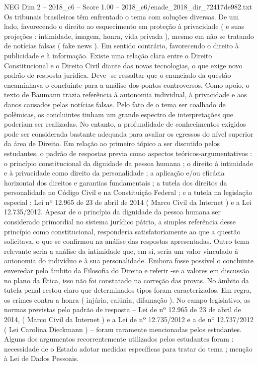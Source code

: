 \begin{textsample}{NEG Dim 2 – 2018\_c6 – Score 1.00 – 2018\_c6/enade\_2018\_dir\_72417de982.txt}
Os tribunais brasileiros têm enfrentado o tema com soluções diversas.
De um lado, favorecendo o direito ao esquecimento em proteção à privacidade ( e suas projeções : intimidade, imagem, honra, vida privada ), mesmo em não se tratando de notícias falsas ( fake news ).
Em sentido contrário, favorecendo o direito à publicidade e à informação.
Existe uma relação clara entre o Direito Constitucional e o Direito Civil diante das novas tecnologias, o que exige novo padrão de resposta jurídica.
Deve -se ressaltar que o enunciado da questão encaminhava o concluinte para a análise dos pontos controversos.
Como apoio, o texto de Baumann trazia referência à autonomia individual, à privacidade e aos danos causados pelas notícias falsas.
Pelo fato de o tema ser coalhado de polêmicas, os concluintes tinham um grande espectro de interpretações que poderiam ser realizadas.
No entanto, a profundidade de conhecimentos exigidos pode ser considerada bastante adequada para avaliar os egressos do nível superior da área de Direito.
Em relação ao primeiro tópico a ser discutido pelos estudantes, o padrão de respostas previa como aspectos teóricos-argumentativos : o princípio constitucional da dignidade da pessoa humana ; o direito à intimidade e à privacidade como direito da personalidade ; a aplicação e/ou eficácia horizontal dos direitos e garantias fundamentais ; a tutela dos direitos da personalidade no Código Civil e na Constituição Federal ; e a tutela na legislação especial : Lei nº 12.965 de 23 de abril de 2014 ( Marco Civil da Internet ) e a Lei 12.735/2012.
Apesar de o princípio da dignidade da pessoa humana ser considerado primordial no sistema jurídico pátrio, a simples referência desse princípio como constitucional, responderia satisfatoriamente ao que a questão solicitava, o que se confirmou na análise das respostas apresentadas.
Outro tema relevante seria a análise da intimidade que, em si, seria um valor vinculado à autonomia do indivíduo e à sua personalidade.
Embora fosse possível o concluinte enveredar pelo âmbito da Filosofia do Direito e referir -se a valores em discussão no plano da Ética, isso não foi constatado na correção das provas.
No âmbito da tutela penal restou claro que determinados tipos foram caracterizados.
Em regra, os crimes contra a honra ( injúria, calúnia, difamação ).
No campo legislativo, as normas previstas pelo padrão de resposta – Lei de nº 12.965 de 23 de abril de 2014, ( Marco Civil da Internet ) e a Lei de nº 12.735/2012 e a de nº 12.737/2012 ( Lei Carolina Dieckmann ) – foram raramente mencionadas pelos estudantes.
Alguns dos argumentos recorrentemente utilizados pelos estudantes foram : necessidade de o Estado adotar medidas específicas para tratar do tema ; menção à Lei de Dados Pessoais.

\end{textsample}
